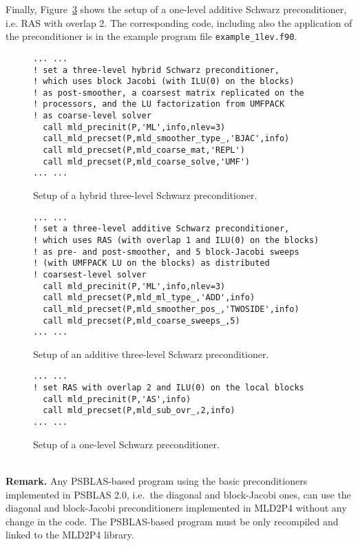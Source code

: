 Finally, Figure~\ref{fig:ex_1l} shows the setup of a one-level
additive Schwarz preconditioner, i.e. RAS with overlap 2. The corresponding code,
including also the application of the preconditioner is in the example
program file \verb|example_1lev.f90|.

\begin{figure}[tbp]
\begin{center}
{\small
\begin{verbatim}
... ...
! set a three-level hybrid Schwarz preconditioner,
! which uses block Jacobi (with ILU(0) on the blocks)
! as post-smoother, a coarsest matrix replicated on the
! processors, and the LU factorization from UMFPACK
! as coarse-level solver
  call mld_precinit(P,'ML',info,nlev=3)
  call_mld_precset(P,mld_smoother_type_,'BJAC',info)
  call mld_precset(P,mld_coarse_mat,'REPL')
  call mld_precset(P,mld_coarse_solve,'UMF')
... ...
\end{verbatim}
}
\caption{Setup of a hybrid three-level Schwarz preconditioner.\label{fig:ex_3lh}}
\end{center}
\end{figure}

\begin{figure}[htb]
\begin{center}
{\small
\begin{verbatim}
... ...
! set a three-level additive Schwarz preconditioner,
! which uses RAS (with overlap 1 and ILU(0) on the blocks)
! as pre- and post-smoother, and 5 block-Jacobi sweeps
! (with UMFPACK LU on the blocks) as distributed
! coarsest-level solver
  call mld_precinit(P,'ML',info,nlev=3)
  call mld_precset(P,mld_ml_type_,'ADD',info)
  call_mld_precset(P,mld_smoother_pos_,'TWOSIDE',info)
  call mld_precset(P,mld_coarse_sweeps_,5)
... ...
\end{verbatim}
}
\caption{Setup of an additive three-level Schwarz preconditioner.\label{fig:ex_3la}}
\end{center}
\end{figure}

\begin{figure}[htb]
\begin{center}
{\small
\begin{verbatim}
... ...
! set RAS with overlap 2 and ILU(0) on the local blocks
  call mld_precinit(P,'AS',info)
  call mld_precset(P,mld_sub_ovr_,2,info)
... ...
\end{verbatim}
}
\caption{Setup of a one-level Schwarz preconditioner.\label{fig:ex_1l}}
\end{center}
\end{figure}

\ \\
\textbf{Remark.} Any PSBLAS-based program using the basic preconditioners
implemented in PSBLAS 2.0, i.e.\ the diagonal and block-Jacobi ones,
can use the diagonal and block-Jacobi preconditioners
implemented in MLD2P4 without any change in the code.
The PSBLAS-based program must be only recompiled
and linked to the MLD2P4 library.

